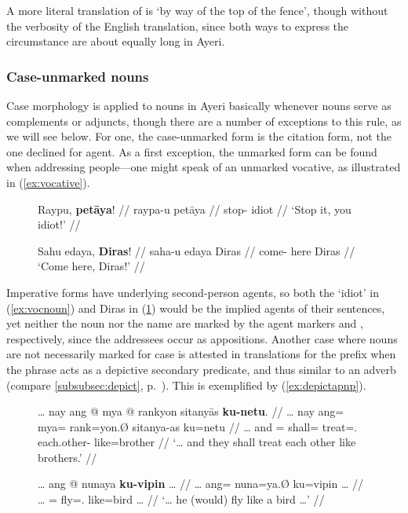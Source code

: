 A more literal translation of  is `by
way of the top of the fence', though without the verbosity of the English
translation, since both ways to express the circumstance are about equally long
in Ayeri.


\subsubsection{Case-unmarked nouns}
\label{subsec:uncased}

Case morphology is applied to nouns in Ayeri basically whenever nouns serve as
complements or adjuncts, though there are a number of exceptions to this rule,
as we will see below. For one, the case-unmarked form is the citation form, not
the one declined for agent. As a first exception, the unmarked form can be
found when addressing people---one might speak of an unmarked vocative, as
illustrated in (\ref{ex:vocative}).

\begin{figure}[h]
\pex\label{ex:vocative}
\a\label{ex:vocnoun}\begingl
	\gla Raypu, \textbf{petāya}! //
	\glb raypa-u petāya //
	\glc stop-\Imp{} idiot //
	\glft `Stop it, you idiot!' //
\endgl

\a\label{ex:vocname}\begingl
	\gla Sahu edaya, \textbf{Diras}! //
	\glb saha-u edaya Diras //
	\glc come-\Imp{} here Diras //
	\glft `Come here, Diras!' //
\endgl
\xe
\end{figure}

Imperative forms have underlying second-person agents, so both the `idiot' in
(\ref{ex:vocnoun}) and Diras in (\ref{ex:vocname}) would be the implied agents
of their sentences, yet neither the noun nor the name are marked by the agent
markers  and , respectively, since the
addressees occur as appositions. Another case where nouns are not necessarily
marked for case is attested in translations for the prefix
 when the phrase acts as a depictive secondary
predicate, and thus similar to an adverb (compare \autoref{subsubsec:depict},
p.~\pageref{subsubsec:depict}). This is exemplified by
(\ref{ex:depictapnp}).

\begin{figure}[h]
\pex\label{ex:depictapnp}
\a\label{ex:kuudhr}\begingl
	\gla … nay ang @ mya @ rankyon sitanyās \textbf{ku-netu}. //
	\glb … nay ang= mya= rank=yon.Ø sitanya-as ku=netu //
	\glc … and \AgtT{}= shall= treat=\TplN{}.\Top{} 
		each.other-\Parg{} like=brother //
	\glft `… and they shall treat each other like brothers.'\footnotemark%
	//
\endgl

\a\label{ex:kukafka}\begingl
	\gla … ang @ nunaya \textbf{ku-vipin} … //
	\glb … ang= nuna=ya.Ø ku=vipin … //
	\glc … \AgtT{}= fly=\TsgM{}.\Top{} like=bird … //
	\glft `… he (would) fly like a bird …'%
	//
\endgl
\xe
\end{figure}

